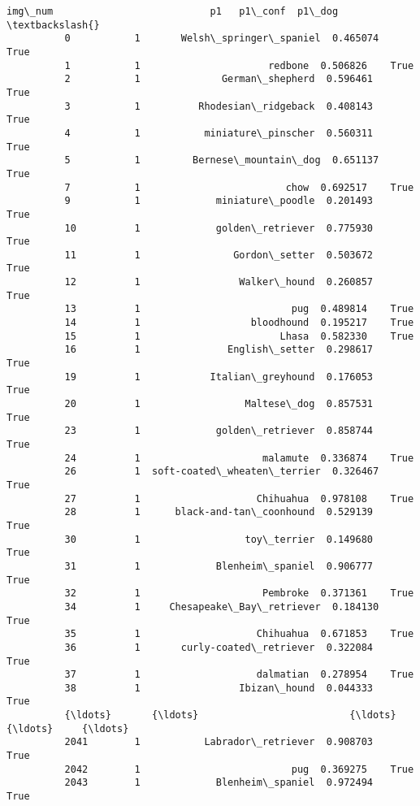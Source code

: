 \documentclass[11pt]{article}
\begin{document}
\begin{Verbatim}[commandchars=\\\{\}]
                img\_num                           p1   p1\_conf  p1\_dog  \textbackslash{}
          0           1       Welsh\_springer\_spaniel  0.465074    True   
          1           1                      redbone  0.506826    True   
          2           1              German\_shepherd  0.596461    True   
          3           1          Rhodesian\_ridgeback  0.408143    True   
          4           1           miniature\_pinscher  0.560311    True   
          5           1         Bernese\_mountain\_dog  0.651137    True   
          7           1                         chow  0.692517    True   
          9           1             miniature\_poodle  0.201493    True   
          10          1             golden\_retriever  0.775930    True   
          11          1                Gordon\_setter  0.503672    True   
          12          1                 Walker\_hound  0.260857    True   
          13          1                          pug  0.489814    True   
          14          1                   bloodhound  0.195217    True   
          15          1                        Lhasa  0.582330    True   
          16          1               English\_setter  0.298617    True   
          19          1            Italian\_greyhound  0.176053    True   
          20          1                  Maltese\_dog  0.857531    True   
          23          1             golden\_retriever  0.858744    True   
          24          1                     malamute  0.336874    True   
          26          1  soft-coated\_wheaten\_terrier  0.326467    True   
          27          1                    Chihuahua  0.978108    True   
          28          1      black-and-tan\_coonhound  0.529139    True   
          30          1                  toy\_terrier  0.149680    True   
          31          1             Blenheim\_spaniel  0.906777    True   
          32          1                     Pembroke  0.371361    True   
          34          1     Chesapeake\_Bay\_retriever  0.184130    True   
          35          1                    Chihuahua  0.671853    True   
          36          1       curly-coated\_retriever  0.322084    True   
          37          1                    dalmatian  0.278954    True   
          38          1                 Ibizan\_hound  0.044333    True   
          {\ldots}       {\ldots}                          {\ldots}       {\ldots}     {\ldots}   
          2041        1           Labrador\_retriever  0.908703    True   
          2042        1                          pug  0.369275    True   
          2043        1             Blenheim\_spaniel  0.972494    True   

\end{Verbatim}
\end{document}

